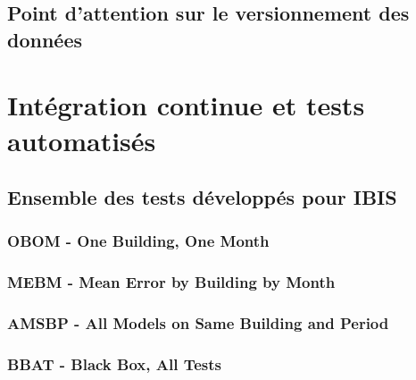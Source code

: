     \subsection{Point d'attention sur le versionnement des données}\label{subsec:point-d'attention-sur-le-versionnement-des-donnees}

\section{Intégration continue et tests automatisés}\label{sec:integration-continue-et-tests-automatises}
    \subsection{Ensemble des tests développés pour IBIS}\label{subsec:ensemble-des-tests-developpes-pour-ibis}
        \subsubsection{OBOM - One Building, One Month}
        \subsubsection{MEBM - Mean Error by Building by Month}
        \subsubsection{AMSBP - All Models on Same Building and Period}
        \subsubsection{BBAT - Black Box, All Tests}


